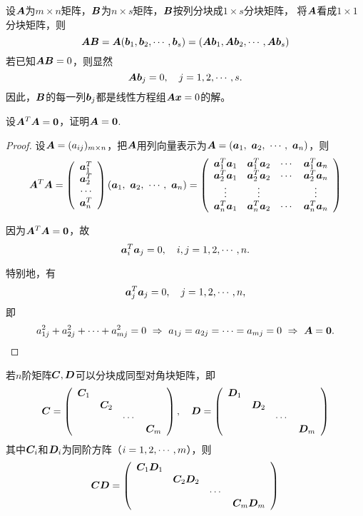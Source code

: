 \begin{li}
  设$\A$为$m\times n$矩阵，$\B$为$n\times s$矩阵，$\B$按列分块成$1\times s$分块矩阵，
  将$\A$看成$1\times 1$分块矩阵，则
  $$
  \A\B=\A(\bb_1,\bb_2,\cd,\bb_s)=(\A\bb_1,\A\bb_2,\cd,\A\bb_s)      
  $$
  若已知$\A\B=0$，则显然
  $$
  \A\bb_j=0, \quad j=1,2,\cd,s.
  $$
  因此，$\B$的每一列$\bb_j$都是线性方程组$\A\xx=0$的解。
\end{li}    

\begin{li}
  设$\A^T\A=\zero$，证明$\A=\zero$.
\end{li}

\begin{proof}
设$\A=(a_{ij})_{m\times n}$，把$\A$用列向量表示为$\A=(\aa_1, ~\aa_2,~\cd,~\aa_n)$，则
$$
\A^T\A = \left(
  \begin{array}{c}
    \aa_1^T\\
    \aa_2^T\\
    \cd \\
    \aa_n^T
  \end{array}
\right) (\aa_1, ~\aa_2,~\cd,~\aa_n) = \left(
  \begin{array}{cccc}
    \aa_1^T\aa_1 & \aa_1^T\aa_2 & \cd & \aa_1^T\aa_n\\
    \aa_2^T\aa_1 & \aa_2^T\aa_2 & \cd & \aa_2^T\aa_n\\
    \vd & \vd & & \vd \\
    \aa_n^T\aa_1 & \aa_n^T\aa_2 & \cd & \aa_n^T\aa_n
  \end{array}
\right)
$$

因为$\A^T\A=\zero$，故
$$
\aa_i^T \aa_j = 0, \quad i,j=1,2,\cd,n.
$$

特别地，有
$$
\aa_j^T \aa_j = 0, \quad j=1,2,\cd,n,
$$
即
$$
a_{1j}^2+a_{2j}^2+\cd+a_{mj}^2=0  ~\Rightarrow~ a_{1j}=a_{2j}=\cd=a_{mj}=0 ~\Rightarrow~ \A = \zero.
$$
\end{proof}


\begin{li}
  若$n$阶矩阵$\C,\D$可以分块成同型对角块矩阵，即
  $$
  \C = \left(
    \begin{array}{cccc}
      \C_1&&&\\
      &\C_2&&\\
      &&\cd&\\
      &&&\C_m
    \end{array}
  \right),\quad
  \D = \left(
    \begin{array}{cccc}
      \D_1&&&\\
      &\D_2&&\\
      &&\cd&\\
      &&&\D_m
    \end{array}
  \right)
  $$
  其中$\C_i$和$\D_i$为同阶方阵（$i=1,2,\cd,m$），则
  $$
  \C\D = \left(
    \begin{array}{cccc}
      \C_1\D_1&&&\\
      &\C_2\D_2&&\\
      &&\cd&\\
      &&&\C_m\D_m
    \end{array}
  \right)
  $$
\end{li}







